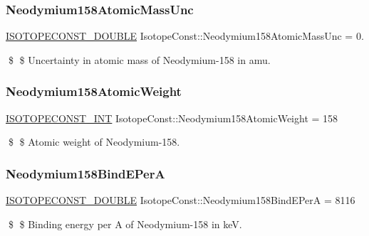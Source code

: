 \subsubsection{\texorpdfstring{Neodymium158\+Atomic\+Mass\+Unc}{Neodymium158AtomicMassUnc}}
{\footnotesize\ttfamily \mbox{\hyperlink{group___isotope_const-_macros_ga8f45a7272ce02c0b4c65c44636ed719a}{I\+S\+O\+T\+O\+P\+E\+C\+O\+N\+S\+T\+\_\+\+D\+O\+U\+B\+LE}} Isotope\+Const\+::\+Neodymium158\+Atomic\+Mass\+Unc = 0.}

\$ \$ Uncertainty in atomic mass of Neodymium-\/158 in amu. \mbox{\label{group___isotope_const-_neodymium-_nd158_ga3ea46ff2fe60fa5356086d4018df4b47}} 
\subsubsection{\texorpdfstring{Neodymium158\+Atomic\+Weight}{Neodymium158AtomicWeight}}
{\footnotesize\ttfamily \mbox{\hyperlink{group___isotope_const-_macros_ga5f18360b3e99483a35c32d789e62621c}{I\+S\+O\+T\+O\+P\+E\+C\+O\+N\+S\+T\+\_\+\+I\+NT}} Isotope\+Const\+::\+Neodymium158\+Atomic\+Weight = 158}

\$ \$ Atomic weight of Neodymium-\/158. \mbox{\label{group___isotope_const-_neodymium-_nd158_gaae38c27ab175224f2478e4d6b5dd493e}} 
\subsubsection{\texorpdfstring{Neodymium158\+Bind\+E\+PerA}{Neodymium158BindEPerA}}
{\footnotesize\ttfamily \mbox{\hyperlink{group___isotope_const-_macros_ga8f45a7272ce02c0b4c65c44636ed719a}{I\+S\+O\+T\+O\+P\+E\+C\+O\+N\+S\+T\+\_\+\+D\+O\+U\+B\+LE}} Isotope\+Const\+::\+Neodymium158\+Bind\+E\+PerA = 8116}

\$ \$ Binding energy per A of Neodymium-\/158 in keV. \mbox{\label{group___isotope_const-_neodymium-_nd158_ga299c0ef51ec630ec77900ef4e9251080}} 
